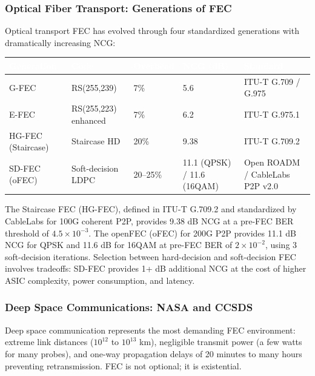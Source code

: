 \documentclass[11pt,letterpaper]{article}
\newcommand{\tableheader}[1]{\textbf{\sffamily\textcolor{white}{#1}}}
\begin{document}
\subsubsection{Optical Fiber Transport: Generations of FEC}

Optical transport FEC has evolved through four standardized generations with dramatically increasing NCG:

\begin{center}
\begin{tabularx}{\textwidth}{L{2.2cm}L{3.5cm}C{2cm}C{2.5cm}X}
\toprule
{}
\tableheader{Generation} & \tableheader{Code} & \tableheader{Overhead} & \tableheader{NCG (dB)} & \tableheader{Standard} \\
\midrule
G-FEC & RS(255,239) & 7\% & 5.6 & ITU-T G.709 / G.975 \\
E-FEC & RS(255,223) enhanced & 7\% & 6.2 & ITU-T G.975.1 \\
HG-FEC (Staircase) & Staircase HD & 20\% & 9.38 & ITU-T G.709.2 \\
SD-FEC (oFEC) & Soft-decision LDPC & 20--25\% & 11.1 (QPSK) / 11.6 (16QAM) & Open ROADM / CableLabs P2P v2.0 \\
\bottomrule
\end{tabularx}
\end{center}

The Staircase FEC (HG-FEC), defined in ITU-T G.709.2 and standardized by CableLabs for 100G coherent P2P, provides 9.38 dB NCG at a pre-FEC BER threshold of $4.5 \times 10^{-3}$. The openFEC (oFEC) for 200G P2P provides 11.1 dB NCG for QPSK and 11.6 dB for 16QAM at pre-FEC BER of $2 \times 10^{-2}$, using 3 soft-decision iterations. Selection between hard-decision and soft-decision FEC involves tradeoffs: SD-FEC provides 1+ dB additional NCG at the cost of higher ASIC complexity, power consumption, and latency.

\subsubsection{Deep Space Communications: NASA and CCSDS}

Deep space communication represents the most demanding FEC environment: extreme link distances ($10^{12}$ to $10^{13}$ km), negligible transmit power (a few watts for many probes), and one-way propagation delays of 20 minutes to many hours preventing retransmission. FEC is not optional; it is existential.
\end{document}

